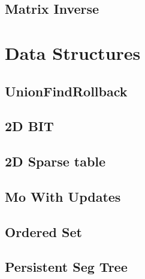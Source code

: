 \subsection{Matrix Inverse}
\vspace{-2.2ex}
\raggedbottom
\vspace{-3.2ex}
\hrulefill

\section{Data Structures}
\subsection{UnionFindRollback}
\vspace{-2.2ex}
\raggedbottom
\vspace{-3.2ex}
\hrulefill
\subsection{2D BIT}
\vspace{-2.2ex}
\raggedbottom
\vspace{-3.2ex}
\hrulefill
\subsection{2D Sparse table}
\vspace{-2.2ex}
\raggedbottom
\vspace{-3.2ex}
\hrulefill
\subsection{Mo With Updates}
\vspace{-2.2ex}
\raggedbottom
\vspace{-3.2ex}
\hrulefill
\subsection{Ordered Set}
\vspace{-2.2ex}
\raggedbottom
\vspace{-3.2ex}
\hrulefill
\subsection{Persistent Seg Tree}
\vspace{-2.2ex}
\raggedbottom
\vspace{-3.2ex}
\hrulefill
